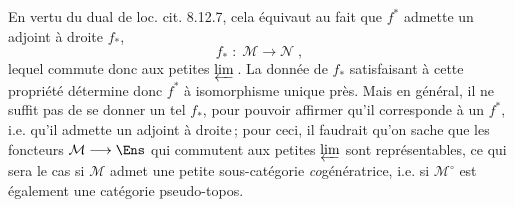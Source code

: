 En vertu du dual de loc. cit. 8.12.7, cela équivaut au fait que $f^*$ admette un adjoint à droite $f_*$,
\[
f_* \;:\; \mathcal{M} \longrightarrow \mathcal{N}\;,
\tag*{(4.1.2)}
\]
lequel commute donc aux petites $\varprojlim$\,. La donnée de $f_*$ satisfaisant à cette propriété détermine donc $f^*$ à isomorphisme unique près. Mais en général, il ne suffit pas de se donner un tel $f_*$, pour pouvoir affirmer qu'il corresponde à un $f^*$, i.e. qu'il admette un adjoint à droite\,; pour ceci, il faudrait qu'on sache que les foncteurs $\mathcal{M}\longrightarrow\Ens$ qui commutent aux petites $\varprojlim$ sont représentables, ce qui sera le cas si $\mathcal{M}$ admet une petite sous-catégorie \textit{co}génératrice, i.e. si $\mathcal{M}^\circ$ est également une catégorie pseudo-topos. %

\newpage
